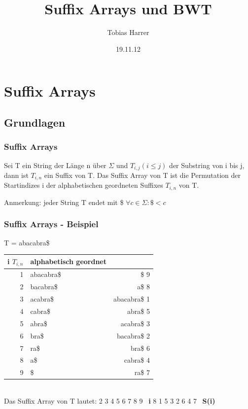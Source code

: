 \documentclass{beamer}
\title{Suffix Arrays und BWT}
\author{Tobias Harrer}
\date{19.11.12}
\begin{document}
\maketitle
\frame{\tableofcontents[currentsection]}
 
\section{Suffix Arrays}
\subsection{Grundlagen}
\begin{frame} %
  \frametitle{Suffix Arrays} %
  \begin{Definition} %
    Sei T ein String der Länge n über $\Sigma$ und $T_{i,j} (i\leq j)$ der Substring von i bis j, dann ist $T_{i,n}$ ein Suffix von T. Das Suffix Array von T ist die Permutation der Startindizes i der alphabetischen geordneten Suffixes $T_{i,n}$ von T.
  \end{Definition}
  Anmerkung: jeder String T endet mit \$ \newline
  $\forall c \in \Sigma : \$ < c$
\end{frame}
\begin{frame}
\frametitle{Suffix Arrays - Beispiel} %
T = \glqq abacabra\$\grqq\\[5mm]

\begin{tabular}{r|l<{\ttfamily} r<{\ttfamily}}
\textbf{i $T_{i,n}$} & \textbf{alphabetisch geordnet}\\\hline
1 & abacabra\$ & \$ 9\\
2 & bacabra\$ & a\$ 8\\
3 & acabra\$ & abacabra\$ 1\\
4 & cabra\$ & abra\$ 5\\
5 & abra\$ & acabra\$ 3\\
6 & bra\$ & bacabra\$ 2\\
7 & ra\$ & bra\$ 6\\
8 & a\$ & cabra\$ 4\\
9 & \$ & ra\$ 7\\
\end{tabular}\\[5mm]
Das Suffix Array von T lautet: \newline
{\ttfamily
{} 2 3 4 5 6 7 8 9 \textrightarrow\ \textbf{i}\newline
{} 8 1 5 3 2 6 4 7 \textrightarrow\ \textbf{S(i)}
}
\end{frame}
\end{document}
